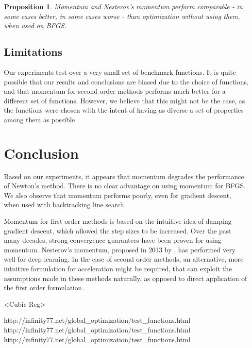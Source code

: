 \documentclass{article}
\newtheorem{prop}{Proposition}
\begin{document}
\begin{prop}
	Momentum and Nesterov's momentum perform comparable - in some cases better, in some cases worse - than optimization without using them, when used on BFGS.
\end{prop}


\subsection{Limitations}
Our experiments test over a very small set of benchmark functions. It is quite possible that our results and conclusions are biased due to the choice of functions, and that momentum for second order methods performs much better for a different set of functions. However, we believe that this might not be the case, as the functions were chosen with the intent of having as diverse a set of properties among them as possible


\section{Conclusion}\label{conclusion}
Based on our experiments, it appears that momentum degrades the performance of Newton's method. There is no clear advantage on using momentum for BFGS. We also observe that momentum performs poorly, even for gradient descent, when used with backtracking line search.

Momentum for first order methods is based on the intuitive idea of damping gradient descent, which allowed the step sizes to be increased. Over the past many decades, strong convergence guarantees have been proven for using momentum. Nesterov's momentum, proposed in 2013 by \citet{Sutskever}, has performed very well for deep learning. In the case of second order methods, an alternative, more intuitive formulation for acceleration might be required, that can exploit the assumptions made in these methods naturally, as opposed to direct application of the first order formulation.

<Cubic Reg>

http://infinity77.net/global\_optimization/test\_functions.html
http://infinity77.net/global\_optimization/test\_functions.html
http://infinity77.net/global\_optimization/test\_functions.html


\end{document}
